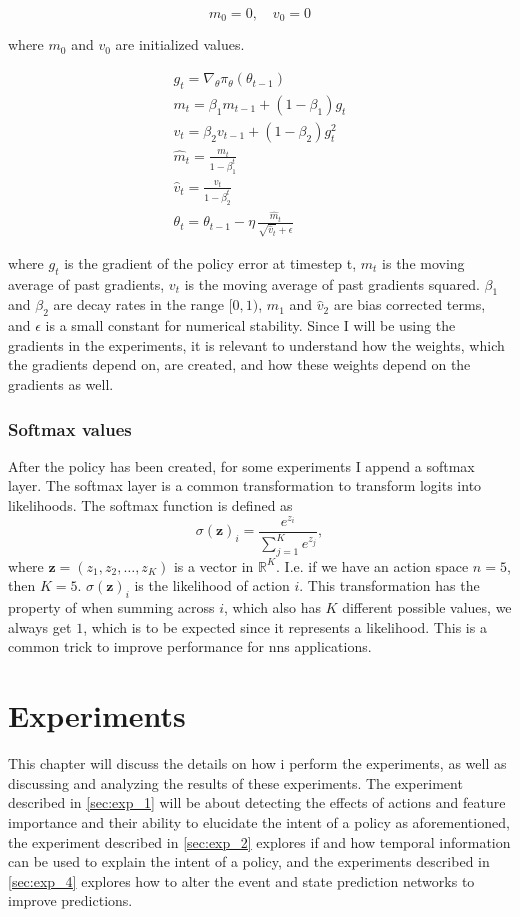 \documentclass[UKenglish]{uiomasterthesis}
\begin{document}
\[
m_0 = 0, \quad v_0 = 0
\]

where $m_0$ and $v_0$ are initialized values.

\begin{equation*}
\begin{gathered}
  g_t = \nabla_{\theta} \pi_\theta(\theta_{t-1}) \\
  m_t = \beta_1 m_{t-1} + (1 - \beta_1) g_t \\
  v_t = \beta_2 v_{t-1} + (1 - \beta_2) g_t^2 \\
  \hat{m}_t = \frac{m_t}{1 - \beta_1^t} \\
  \hat{v}_t = \frac{v_t}{1 - \beta_2^t} \\
  \theta_t = \theta_{t-1} - \eta \, \frac{\hat{m}_t}{\sqrt{\hat{v}_t} + \epsilon}
\end{gathered}
\end{equation*}

where $g_t$ is the gradient of the policy error at timestep t, $m_t$ is the moving average of past gradients, $v_t$ is the moving average of past gradients squared. $\beta_1$ and $\beta_2$ are decay rates in the range $[0,1)$, $\hat m_1$ and $\hat v_2$ are bias corrected terms, and $\epsilon$ is a small constant for numerical stability. Since I will be using the gradients in the experiments, it is relevant to understand how the weights, which the gradients depend on, are created, and how these weights depend on the gradients as well.

\subsection{Softmax values}
After the policy has been created, for some experiments I append a softmax layer. The softmax layer is a common transformation to transform logits into likelihoods\cite{softmax}. The softmax function is defined as
\[
\sigma(\mathbf{z})_i = \frac{e^{z_i}}{\sum_{j=1}^K e^{z_j}},
\]
where \( \mathbf{z} = (z_1, z_2, \ldots, z_K) \) is a vector in \( \mathbb{R}^K \). I.e. if we have an action space $n=5$, then $K=5$. $\sigma(\mathbf{z})_i$ is the likelihood of action $i$. This transformation has the property of when summing across $i$, which also has $K$ different possible values, we always get $1$, which is to be expected since it represents a likelihood. This is a common trick to improve performance for \acp{nn} applications.


\chapter{Experiments}
This chapter will discuss the details on how i perform the experiments, as well as discussing and analyzing the results of these experiments. The experiment described in \ref{sec:exp_1} will be about detecting the effects of actions and feature importance and their ability to elucidate the intent of a policy as aforementioned, the experiment described in \ref{sec:exp_2} explores if and how temporal information can be used to explain the intent of a policy, and the experiments described in \ref{sec:exp_4} explores how to alter the event and state prediction networks to improve predictions.
\end{document}
